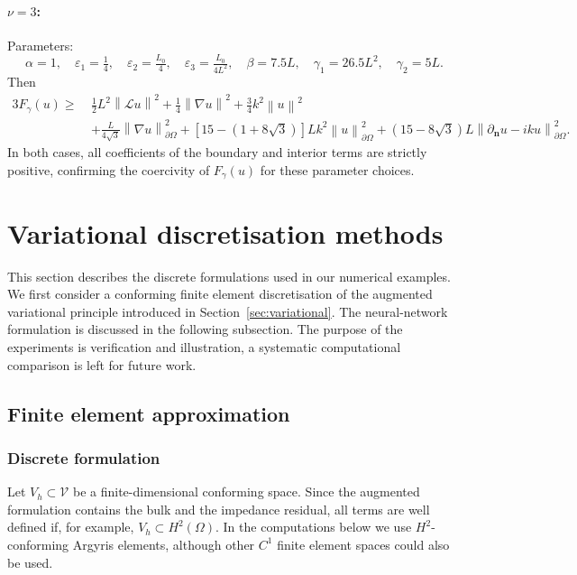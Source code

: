 \documentclass[twoside,11pt]{article}
\def\dimx{\nu }
\def\L{{\mathscr{L}}}
\newcommand{\Norm}[1]{\ensuremath{\left\|#1\right\|}}
\def\Vc{{\mathscr V}}
\def\L{{\mathscr{L}}}
\begin{document}
{\begin{remark}
{\paragraph{$\dimx = 3$:} Parameters:
\[
   \alpha = 1, \quad \varepsilon_1 = \tfrac{1}{4}, \quad
   \varepsilon_2 = \tfrac{L_0}{4}, \quad
   \varepsilon_3 = \tfrac{L_0}{4L^2}, \quad
   \beta = 7.5 L, \quad
   \gamma_1 = 26.5 L^2, \quad
   \gamma_2 = 5 L.
\]
Then
\begin{align*}
  3 F_{\gamma} (u) \ge\ & \frac{1}{2} L^2 \Norm{\L  u}^2 + \frac{1}{4}\Norm{\nabla u}^2 + \frac{3}{4}k^2 \Norm{u}^2 \\
   & + \frac{L}{4\sqrt{3}} \Norm{\nabla u}_{\partial \Omega}^2 + [15 - (1 + 8\sqrt{3})] L k^2 \Norm{u}_{\partial \Omega}^2
      +  (15 - 8\sqrt{3})L \Norm{\partial_{\mathbf n}u - iku}^{2}_{\partial\Omega} .
\end{align*}
In both cases, all coefficients of the boundary and interior terms are strictly positive, confirming the coercivity of  $F_\gamma(u)$
for these parameter choices.
}
\end{remark}


\section{Variational discretisation methods}
\label{sec:numerics}

This section describes the discrete formulations used in our numerical examples. We first consider a conforming finite element discretisation of the augmented variational principle introduced in Section~\ref{sec:variational}. The neural-network formulation is discussed in the following subsection. The purpose of the experiments is verification and illustration, a systematic computational comparison is left for future work.

\subsection{Finite element approximation}

\subsubsection*{Discrete formulation}

Let $V_h\subset \Vc$ be a finite-dimensional conforming space. Since the augmented formulation contains the bulk and the impedance residual, all terms are well defined if, for example, $V_h\subset H^2(\Omega)$. In the computations below we use $H^2$-conforming Argyris elements, although other $C^1$ finite element spaces could also be used.

}
\end{document}

